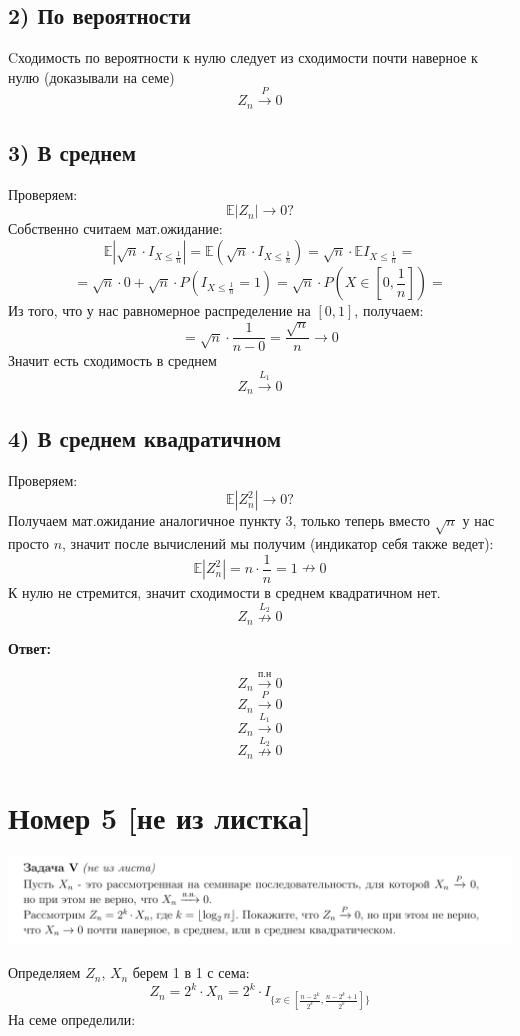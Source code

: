 \documentclass[a4paper,12pt]{article}
\begin{document}
\subsection*{2) По вероятности}
Cходимость по вероятности к нулю следует из сходимости почти наверное к нулю (доказывали на семе)
\[
Z_n \overset{P}{\longrightarrow} 0 
\]
\subsection*{3) В среднем}
Проверяем:
\[
\mathbb{E} |Z_n|  \rightarrow 0 ?
\]
Собственно считаем мат.ожидание:
\[
\mathbb{E} |\sqrt{n} \cdot I_{X \leq \frac{1}{n}}| = \mathbb{E} (\sqrt{n} \cdot I_{X \leq \frac{1}{n}} ) = \sqrt{n} \cdot  \mathbb{E}  I_{X \leq \frac{1}{n}} =
\]
\[
= \sqrt{n} \cdot 0 + \sqrt{n} \cdot P \left(I_{X \leq \frac{1}{n}}  = 1\right) 
=
\sqrt{n} \cdot P \left(X \in \left[0, \frac{1}{n}\right]\right) =
\]
Из того, что у нас равномерное распределение на $[0, 1]$, получаем:
\[
= \sqrt{n} \cdot \frac{1}{n - 0} = \frac{\sqrt{n}}{n} \rightarrow 0 
\]
Значит есть сходимость в среднем
\[
Z_n \overset{L_1}{\longrightarrow} 0 
\]
\subsection*{4) В среднем квадратичном}
Проверяем:
\[
\mathbb{E} |Z_n^2|  \rightarrow 0 ?
\]
Получаем мат.ожидание аналогичное пункту 3, только теперь вместо $\sqrt{n}$ у нас просто $n$, значит после вычислений мы получим (индикатор себя также ведет):
\[
\mathbb{E} |Z_n^2|  = n \cdot \frac{1}{n} = 1 \nrightarrow 0
\]
К нулю не стремится, значит сходимости в среднем квадратичном нет.
\[
Z_n \overset{L_2}{\nrightarrow} 0 
\]
\begin{center}
\textbf{Ответ: } 
\end{center}
\[ 
Z_n \overset{\text{п.н}}{\longrightarrow} 0 
\]
\[
Z_n \overset{P}{\longrightarrow} 0 
\]
\[
Z_n \overset{L_1}{\longrightarrow} 0 
\]
\[
Z_n \overset{L_2}{\nrightarrow} 0 
\]
\clearpage

\section*{Номер 5 [не из листка]}
\begin{center}
\includegraphics[scale=0.4]{4.png}
\end{center} 
Определяем $Z_n$, $X_n$ берем 1 в 1 с сема:
\[
 Z_n = 2^k \cdot X_n = 2^k \cdot
 I_{
\{
x \in  \left[
\frac{n - 2^k}{2^k}, \frac{n - 2^k + 1}{2^k}
\right]
\}
}
\]
На семе определили:
\end{document}
